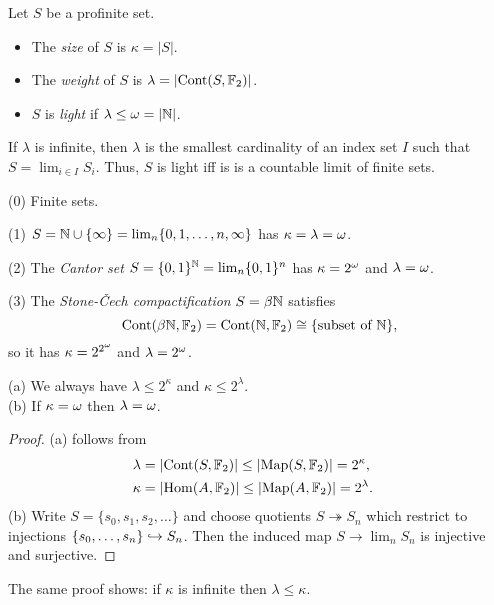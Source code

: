 \documentclass{notes}
\begin{document}
\begin{defi}
Let $S$ be a profinite set. 
\begin{itemize}
\item The {\em size} of $S$ is $\kappa=|S|$.
\item The {\em weight} of $S$ is $\lambda=|{\rm Cont}(S,{\mathbb{F}}_2)|$.
\item $S$ is {\em light} if $\lambda\leq{\omega}=|{\mathbb{N}}|$.
\end{itemize}
\end{defi}

\begin{rem}
If $\lambda$ is infinite, then $\lambda$ is the smallest
  cardinality of an index set $I$ such that $S=\lim_{i\in I}S_i$.
Thus, $S$ is light iff is is a countable limit of finite sets.
\end{rem}

\begin{example}
(0) Finite sets.
  
(1) $S = {\mathbb{N}}\cup\{\infty\} = \lim_n\{0,1,\dots,n,\infty\}$ has $\kappa=\lambda={\omega}$. 

(2) The {\em Cantor set} $S = \{0,1\}^{\mathbb{N}} = \lim_n\{0,1\}^n$ has
  $\kappa=2^{\omega}$ and $\lambda={\omega}$.

(3) The {\em Stone-\v{C}ech compactification} $S=\beta{\mathbb{N}}$ satisfies 
$$
  {\rm Cont}(\beta{\mathbb{N}},{\mathbb{F}}_2) = {\rm Cont}({\mathbb{N}},{\mathbb{F}}_2) \cong \{\text{subset of }{\mathbb{N}}\},
$$
so it has $\kappa=2^{2^{\omega}}$ and $\lambda=2^{\omega}$. 
\end{example}

\begin{prop}
(a) We always have $\lambda\leq 2^\kappa$ and $\kappa\leq 2^\lambda$. \\
(b) If $\kappa={\omega}$ then $\lambda={\omega}$. 
\end{prop}

\begin{proof}
(a) follows from
\begin{align*}
  \lambda &= |{\rm Cont}(S,{\mathbb{F}}_2)| \leq |{\rm Map}(S,{\mathbb{F}}_2)| = 2^\kappa, \cr
  \kappa &= |\mathrm{Hom}(A,{\mathbb{F}}_2)| \leq |{\rm Map}(A,{\mathbb{F}}_2)| = 2^\lambda.
\end{align*}
(b) Write $S=\{s_0,s_1,s_2,\dots\}$ and choose quotients
$S\twoheadrightarrow S_n$ which restrict to injections
$\{s_0,\dots,s_n\}\hookrightarrow S_n$. Then the induced map $S\to\lim_n S_n$ is
injective and surjective.
\end{proof}

\begin{rem}
The same proof shows: if $\kappa$ is infinite then $\lambda\leq\kappa$.
\end{rem}
\end{document}
